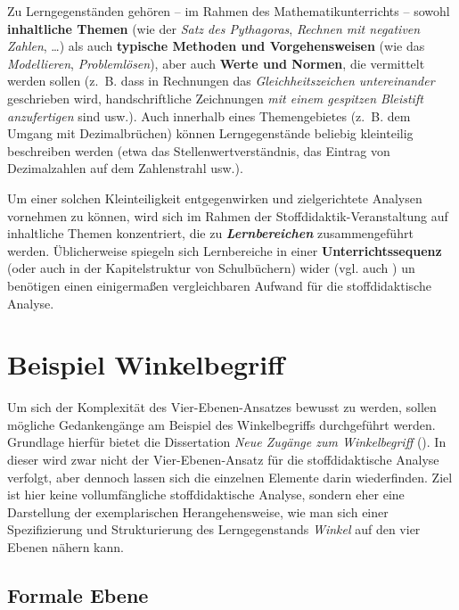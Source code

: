 \documentclass[
]{scrbook}
\theoremstyle{definition}
\theoremstyle{definition}
\theoremstyle{definition}
\theoremstyle{definition}
\theoremstyle{remark}
\begin{document}
Zu Lerngegenständen gehören -- im Rahmen des Mathematikunterrichts -- sowohl \textbf{inhaltliche Themen} (wie der \emph{Satz des Pythagoras}, \emph{Rechnen mit negativen Zahlen}, \ldots) als auch \textbf{typische Methoden und Vorgehensweisen} (wie das \emph{Modellieren}, \emph{Problemlösen}), aber auch \textbf{Werte und Normen}, die vermittelt werden sollen (z.~B. dass in Rechnungen das \emph{Gleichheitszeichen untereinander} geschrieben wird, handschriftliche Zeichnungen \emph{mit einem gespitzen Bleistift anzufertigen} sind usw.). Auch innerhalb eines Themengebietes (z.~B. dem Umgang mit Dezimalbrüchen) können Lerngegenstände beliebig kleinteilig beschreiben werden (etwa das Stellenwertverständnis, das Eintrag von Dezimalzahlen auf dem Zahlenstrahl usw.).

Um einer solchen Kleinteiligkeit entgegenwirken und zielgerichtete Analysen vornehmen zu können, wird sich im Rahmen der Stoffdidaktik-Veranstaltung auf inhaltliche Themen konzentriert, die zu \textbf{\emph{Lernbereichen}} zusammengeführt werden. Üblicherweise spiegeln sich Lernbereiche in einer \textbf{Unterrichtssequenz} (oder auch in der Kapitelstruktur von Schulbüchern) wider (vgl. auch ) un benötigen einen einigermaßen vergleichbaren Aufwand für die stoffdidaktische Analyse.

\section{Beispiel Winkelbegriff}\label{beispiel-winkelbegriff}

Um sich der Komplexität des Vier-Ebenen-Ansatzes bewusst zu werden, sollen mögliche Gedankengänge am Beispiel des Winkelbegriffs durchgeführt werden. Grundlage hierfür bietet die Dissertation \emph{Neue Zugänge zum Winkelbegriff} (). In dieser wird zwar nicht der Vier-Ebenen-Ansatz für die stoffdidaktische Analyse verfolgt, aber dennoch lassen sich die einzelnen Elemente darin wiederfinden. Ziel ist hier keine vollumfängliche stoffdidaktische Analyse, sondern eher eine Darstellung der exemplarischen Herangehensweise, wie man sich einer Spezifizierung und Strukturierung des Lerngegenstands \emph{Winkel} auf den vier Ebenen nähern kann.

\subsection{Formale Ebene}\label{formale-ebene}
\end{document}
